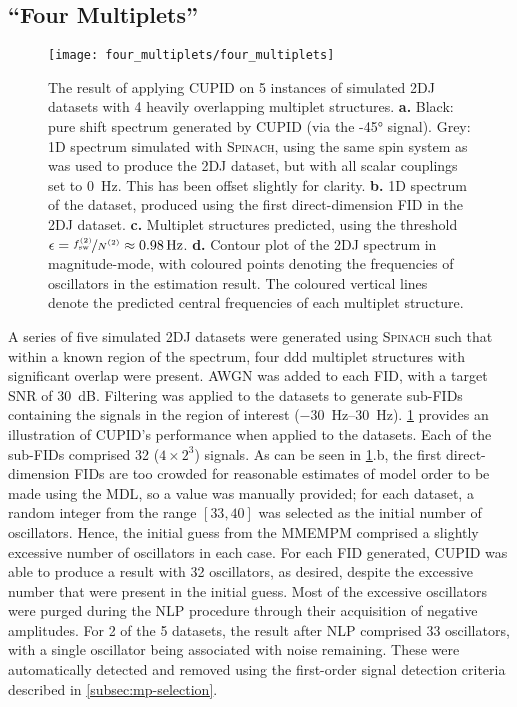 \subsection{``Four Multiplets''}
\label{subsec:four-mp}
\begin{figure}
    \centering
    \texttt{[image: four\_multiplets/four\_multiplets]}
    \caption[
        The result of applying \acs{CUPID} on 5 instances of simulated
        \acs{2DJ} datasets with 4 heavily overlapping multiplet structures.
    ]{
        The result of applying \ac{CUPID} on 5 instances of simulated \ac{2DJ}
        datasets with 4 heavily overlapping multiplet structures.
        \textbf{a.} Black: pure shift spectrum generated by \ac{CUPID} (via the
        \ang{-45} signal).
        Grey: \ac{1D} spectrum simulated with \textsc{Spinach}, using the same spin
        system as was used to produce the \ac{2DJ} dataset, but with all scalar
        couplings set to \qty{0}{\hertz}. This has been offset slightly for
        clarity.
        \textbf{b.} \ac{1D} spectrum of the dataset, produced using the first
        direct-dimension \ac{FID} in the \ac{2DJ} dataset.
        \textbf{c.} Multiplet structures predicted, using the threshold $\epsilon
        = \nicefrac{\fswtwo}{\Ntwo} \approx \qty{0.98}{\hertz}$.
        \textbf{d.} Contour plot of the \ac{2DJ} spectrum in magnitude-mode,
        with coloured points denoting the frequencies of oscillators in the
        estimation result. The coloured vertical lines denote the predicted
        central frequencies of each multiplet structure.
    }
    \label{fig:four-multiplets}
\end{figure}

A series of five simulated \ac{2DJ} datasets
were generated using \textsc{Spinach} such that within a
known region of the spectrum, four ddd multiplet
structures with significant overlap were present. \ac{AWGN} was added to each
\ac{FID}, with a target \ac{SNR} of \qty{30}{\deci\bel}.
Filtering was applied to the datasets to generate sub-\acp{FID} containing the
signals in the region of interest
(\SIrange{-30}{30}{\hertz}).
\cref{fig:four-multiplets} provides an illustration of \ac{CUPID}'s performance
when applied to the datasets.
Each of the sub-\acp{FID} comprised 32 ($4 \times 2^3$) signals.
As can be seen in \cref{fig:four-multiplets}.b, the first direct-dimension
\acp{FID} are too crowded for reasonable estimates of model
order to be made using the \ac{MDL}, so a value was manually provided; for each
dataset, a random
integer from the range $[33, 40]$ was selected as the initial number of
oscillators. Hence, the initial guess from the \ac{MMEMPM} comprised a
slightly excessive number of oscillators in each case.
For each \ac{FID} generated, \ac{CUPID} was able to produce a
result with 32 oscillators, as desired, despite the excessive number
that were present in the initial guess. Most of the excessive oscillators were
purged during the \ac{NLP} procedure through their acquisition of negative
amplitudes.
For 2 of the 5 datasets, the result after \ac{NLP} comprised 33
oscillators, with a single oscillator being associated with noise remaining.
These were automatically detected and removed using the first-order signal
detection criteria described in \cref{subsec:mp-selection}.

